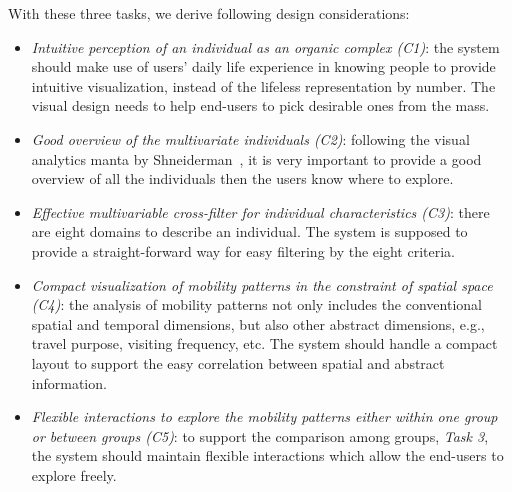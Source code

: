With these three tasks, we derive following design considerations:

\begin{itemize}
\item \textit{Intuitive perception of an individual as an organic complex (C1)}: the system should make use of users' daily life experience in knowing people to provide intuitive visualization, instead of the lifeless representation by number. The visual design needs to help end-users to pick desirable ones from the mass.
\item \textit{Good overview of the multivariate individuals (C2)}: following the visual analytics manta by Shneiderman~\citep{RN459}, it is very important to provide a good overview of all the individuals then the users know where to explore.
\item \textit{Effective multivariable cross-filter for individual characteristics (C3)}: there are eight domains to describe an individual. The system is supposed to provide a straight-forward way for easy filtering by the eight criteria.
\item \textit{Compact visualization of mobility patterns in the constraint of spatial space (C4)}: the analysis of mobility patterns not only includes the conventional spatial and temporal dimensions, but also other abstract dimensions, e.g., travel purpose, visiting frequency, etc. The system should handle a compact layout to support the easy correlation between spatial and abstract information.
\item \textit{Flexible interactions to explore the mobility patterns either within one group or between groups (C5)}: to support the comparison among groups, \textit{Task 3}, the system should maintain flexible interactions which allow the end-users to explore freely.
\end{itemize}


